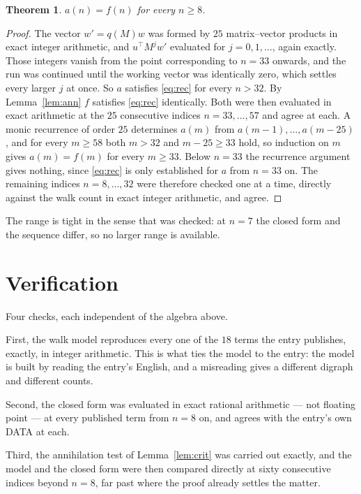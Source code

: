 \documentclass[11pt,a4paper]{article}
\theoremstyle{plain}
\newtheorem{theorem}{Theorem}
\theoremstyle{definition}
\begin{document}
\begin{theorem}
$a(n)=f(n)$ for every $n\ge8$.
\end{theorem}

\begin{proof}
The vector $w'=q(M)w$ was formed by $25$ matrix--vector products in exact integer
arithmetic, and $u^{\!\top}M^{j}w'$ evaluated for $j=0,1,\dots$, again exactly. Those integers
vanish from the point corresponding to $n=33$ onwards, and the run was continued until the
working vector was identically zero, which settles every larger $j$ at once. So $a$ satisfies
\eqref{eq:rec} for every $n>32$. By Lemma~\ref{lem:ann} $f$ satisfies \eqref{eq:rec}
identically. Both were then evaluated in exact arithmetic at the $25$ consecutive indices
$n=33,\dots,57$ and agree at each. A monic recurrence of order $25$
determines $a(m)$ from $a(m-1),\dots,a(m-25)$, and for every $m\ge58$ both
$m>32$ and $m-25\ge33$ hold, so induction on $m$ gives $a(m)=f(m)$ for every
$m\ge33$.
Below $n=33$ the recurrence argument gives nothing, since \eqref{eq:rec} is only
established for $a$ from $n=33$ on. The remaining indices $n=8,\dots,32$ were
therefore checked one at a time, directly against the walk count in exact integer arithmetic,
and agree.
\end{proof}

The range is tight in the sense that was checked: at $n=7$ the closed form and the sequence differ, so no larger range is available.

\section{Verification}

Four checks, each independent of the algebra above.

First, the walk model reproduces every one of the $18$ terms the entry publishes,
exactly, in integer arithmetic. This is what ties the model to the entry: the model is built
by reading the entry's English, and a misreading gives a different digraph and different
counts.

Second, the closed form was evaluated in exact rational arithmetic --- not floating point ---
at every published term from $n=8$ on, and agrees with the entry's own DATA at each.

Third, the annihilation test of Lemma~\ref{lem:crit} was carried out exactly, and the model
and the closed form were then compared directly at sixty consecutive indices beyond
$n=8$, far past where the proof already settles the matter.
\end{document}
